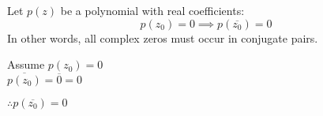 \documentclass[letterpaper,12pt,fleqn]{article}
\newcommand{\conj}[1]{\overline{#1}}
\begin{document}
\begin{corollary}
  Let $p(z)$ be a polynomial with real coefficients:
  \[p(z_0)=0\implies p(\conj{z_0})=0\]
  In other words, all complex zeros must occur in conjugate pairs.
\end{corollary}

\begin{theproof}
  Assume $p(z_0)=0$ \\
  $\conj{p(z_0)}=\conj{0}=0$

  $\therefore p(\conj{z_0})=0$
\end{theproof}
\end{document}
